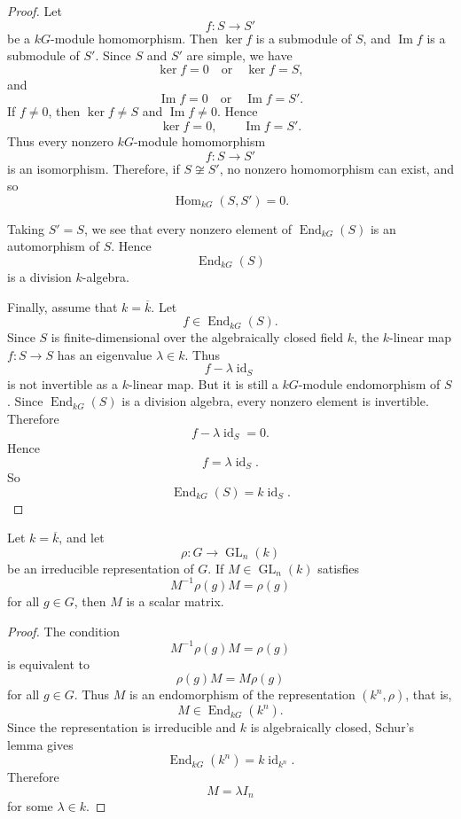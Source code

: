\begin{proof}
    Let
    \[
        f:S\longrightarrow S'
    \]
    be a \(kG\)-module homomorphism. Then \(\ker f\) is a submodule of \(S\), and
    \(\operatorname{Im} f\) is a submodule of \(S'\). Since \(S\) and \(S'\) are
    simple, we have
    \[
        \ker f=0 \quad \text{or} \quad \ker f=S,
    \]
    and
    \[
        \operatorname{Im} f=0 \quad \text{or} \quad \operatorname{Im} f=S'.
    \]
    If \(f\neq 0\), then \(\ker f\neq S\) and \(\operatorname{Im} f\neq 0\). Hence
    \[
        \ker f=0,
        \qquad
        \operatorname{Im} f=S'.
    \]
    Thus every nonzero \(kG\)-module homomorphism
    \[
        f:S\to S'
    \]
    is an isomorphism. Therefore, if \(S\not\cong S'\), no nonzero homomorphism can
    exist, and so
    \[
        \operatorname{Hom}_{kG}(S,S')=0.
    \]

    Taking \(S'=S\), we see that every nonzero element of
    \(\operatorname{End}_{kG}(S)\) is an automorphism of \(S\). Hence
    \[
        \operatorname{End}_{kG}(S)
    \]
    is a division \(k\)-algebra.

    Finally, assume that \(k=\overline{k}\). Let
    \[
        f\in \operatorname{End}_{kG}(S).
    \]
    Since \(S\) is finite-dimensional over the algebraically closed field \(k\),
    the \(k\)-linear map \(f:S\to S\) has an eigenvalue \(\lambda\in k\). Thus
    \[
        f-\lambda\operatorname{id}_S
    \]
    is not invertible as a \(k\)-linear map. But it is still a \(kG\)-module
    endomorphism of \(S\). Since \(\operatorname{End}_{kG}(S)\) is a division
    algebra, every nonzero element is invertible. Therefore
    \[
        f-\lambda\operatorname{id}_S=0.
    \]
    Hence
    \[
        f=\lambda\operatorname{id}_S.
    \]
    So
    \[
        \operatorname{End}_{kG}(S)=k\operatorname{id}_S.
    \]
\end{proof}

\begin{corollary}
    Let \(k=\overline{k}\), and let
    \[
        \rho:G\longrightarrow \operatorname{GL}_n(k)
    \]
    be an irreducible representation of \(G\). If \(M\in \operatorname{GL}_n(k)\)
    satisfies
    \[
        M^{-1}\rho(g)M=\rho(g)
    \]
    for all \(g\in G\), then \(M\) is a scalar matrix.
\end{corollary}

\begin{proof}
    The condition
    \[
        M^{-1}\rho(g)M=\rho(g)
    \]
    is equivalent to
    \[
        \rho(g)M=M\rho(g)
    \]
    for all \(g\in G\). Thus \(M\) is an endomorphism of the representation
    \((k^n,\rho)\), that is,
    \[
        M\in \operatorname{End}_{kG}(k^n).
    \]
    Since the representation is irreducible and \(k\) is algebraically closed,
    Schur's lemma gives
    \[
        \operatorname{End}_{kG}(k^n)=k\operatorname{id}_{k^n}.
    \]
    Therefore
    \[
        M=\lambda I_n
    \]
    for some \(\lambda\in k\).
\end{proof}

